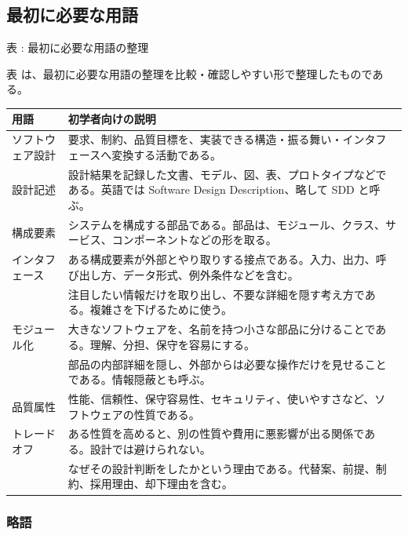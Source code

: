 \subsection*{最初に必要な用語}

\par\smallskip\noindent{}\label{tab:ch03-01}表 \thetable: 最初に必要な用語の整理\par\smallskip
表 \thetable は、最初に必要な用語の整理を比較・確認しやすい形で整理したものである。\par\smallskip
\begin{tabularx}{\linewidth}{L{34mm}Y}
\toprule
用語 & 初学者向けの説明 \\
\midrule
ソフトウェア設計 & 要求、制約、品質目標を、実装できる構造・振る舞い・インタフェースへ変換する活動である。 \\
設計記述 & 設計結果を記録した文書、モデル、図、表、プロトタイプなどである。英語では Software Design Description、略して SDD と呼ぶ。 \\
構成要素 & システムを構成する部品である。部品は、モジュール、クラス、サービス、コンポーネントなどの形を取る。 \\
インタフェース & ある構成要素が外部とやり取りする接点である。入力、出力、呼び出し方、データ形式、例外条件などを含む。 \\
 & 注目したい情報だけを取り出し、不要な詳細を隠す考え方である。複雑さを下げるために使う。 \\
モジュール化 & 大きなソフトウェアを、名前を持つ小さな部品に分けることである。理解、分担、保守を容易にする。 \\
 & 部品の内部詳細を隠し、外部からは必要な操作だけを見せることである。情報隠蔽とも呼ぶ。 \\
品質属性 & 性能、信頼性、保守容易性、セキュリティ、使いやすさなど、ソフトウェアの性質である。 \\
トレードオフ & ある性質を高めると、別の性質や費用に悪影響が出る関係である。設計では避けられない。 \\
 & なぜその設計判断をしたかという理由である。代替案、前提、制約、採用理由、却下理由を含む。 \\
\bottomrule
\end{tabularx}

\subsubsection*{略語}

